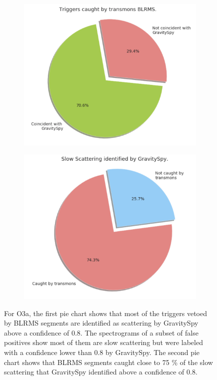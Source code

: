 \documentclass[12pt]{iopart}
\begin{document}
\begin{figure}[h]
   \centering
    \begin{subfigure}[b]{0.45\textwidth}
        \centering
         \includegraphics[width= \textwidth]{transmonvetoed.png}
         \caption{}
         \label{fig:transpie}
    \end{subfigure}
    \hfill
    \begin{subfigure}[b]{0.44\textwidth}
        \centering
         \includegraphics[width =\textwidth]{gspyvetoed.png}
         \caption{}
         \label{fig:gspypie}
         
    
    \end{subfigure}
    \caption{For O3a, the first pie chart shows that most of the triggers vetoed by  BLRMS segments are identified as scattering by GravitySpy above a confidence of 0.8. The spectrograms of a subset of false positives show most of them are slow scattering but were labeled with a confidence lower than 0.8 by GravitySpy. The second pie chart shows that BLRMS segments caught close to 75 \% of the slow scattering that GravitySpy identified above a confidence of 0.8.}
    \label{fig:gspytrans}
    
\end{figure}
\end{document}
